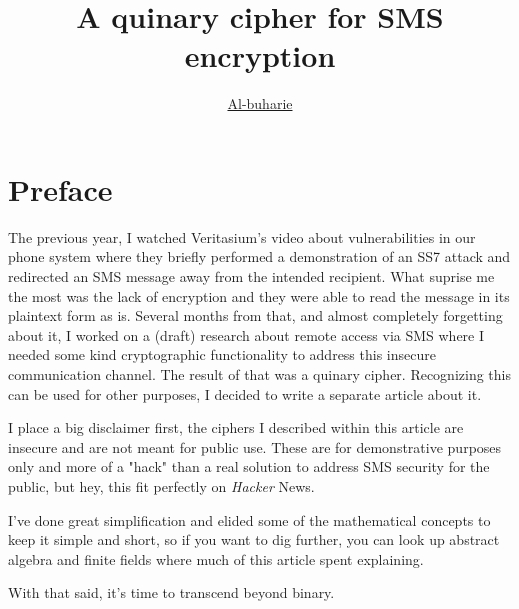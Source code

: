 \documentclass{article}
\title{A quinary cipher for SMS encryption}
\author{\href{https://github.com/harieamjari}{Al-buharie}}
\begin{document}
\maketitle

\section*{Preface}

The previous year, I watched Veritasium's video about vulnerabilities
in our phone system where they briefly performed a demonstration of
an   SS7 attack and redirected an SMS message away from the intended
recipient. What suprise me the most was the lack of encryption and
they were able to read the message in its plaintext form as is. Several
months from that, and almost completely forgetting about it, I worked
on a (draft) research about remote access via SMS where I needed some kind
cryptographic functionality to address this insecure communication
channel. The result of that was a quinary cipher. Recognizing this can
be used for other purposes,
I decided to write a separate article about it.

I place a big disclaimer first, the ciphers I described within this
article are insecure and are not meant for public use. These are for
demonstrative purposes only and more of a "hack" than a real solution
to address SMS security for the public, but hey, this fit perfectly on
\textit{Hacker} News.

I've done great simplification and elided some of the mathematical
concepts to keep it simple and short, so if you want to dig further,
you can look up abstract algebra and finite fields where much of this
article spent explaining.

\medskip

With that said, it's time to transcend beyond binary.

\newpage
\end{document}
